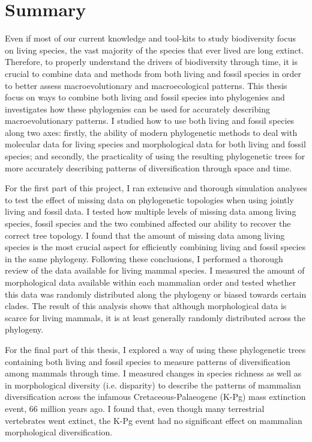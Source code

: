 \chapter*{Summary}

Even if most of our current knowledge and tool-kits to study biodiversity focus on living species, the vast majority of the species that ever lived are long extinct.
Therefore, to properly understand the drivers of biodiversity through time, it is crucial to combine data and methods from both living and fossil species in order to better assess macroevolutionary and macroecological patterns.
This thesis focus on ways to combine both living and fossil species into phylogenies and investigates how these phylogenies can be used for accurately describing macroevolutionary patterns.
I studied how to use both living and fossil species along two axes: firstly, the ability of modern phylogenetic methods to deal with molecular data for living species and morphological data for both living and fossil species; and secondly, the practicality of using the resulting phylogenetic trees for more accurately describing patterns of diversification through space and time.

For the first part of this project, I ran extensive and thorough simulation analyses to test the effect of missing data on phylogenetic topologies when using jointly living and fossil data.
I tested how multiple levels of missing data among living species, fossil species and the two combined affected our ability to recover the correct tree topology.
I found that the amount of missing data among living species is the most crucial aspect for efficiently combining living and fossil species in the same phylogeny.
Following these conclusions, I performed a thorough review of the data available for living mammal species.
I measured the amount of morphological data available within each mammalian order and tested whether this data was randomly distributed along the phylogeny or biased towards certain clades.
The result of this analysis shows that although morphological data is scarce for living mammals, it is at least generally randomly distributed across the phylogeny.

For the final part of this thesis, I explored a way of using these phylogenetic trees containing both living and fossil species to measure patterns of diversification among mammals through time.
I measured changes in species richness as well as in morphological diversity (i.e. disparity) to describe the patterns of mammalian diversification across the infamous Cretaceous-Palaeogene (K-Pg) mass extinction event, 66 million years ago.
I found that, even though many terrestrial vertebrates went extinct, the K-Pg event had no significant effect on mammalian morphological diversification.